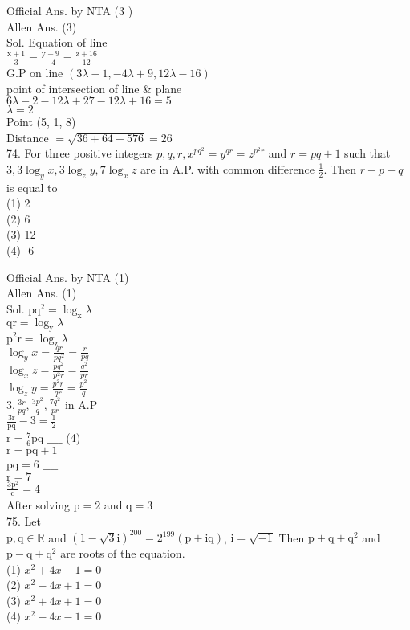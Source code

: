 \documentclass[10pt]{article}
\begin{document}
Official Ans. by NTA (3 )\\
Allen Ans. (3)\\
Sol. Equation of line\\
\(\frac{\mathrm{x}+1}{3}=\frac{\mathrm{y}-9}{-4}=\frac{\mathrm{z}+16}{12}\)\\
G.P on line \((3 \lambda-1,-4 \lambda+9,12 \lambda-16)\)\\
point of intersection of line \& plane\\
\(6 \lambda-2-12 \lambda+27-12 \lambda+16=5\)\\
\(\lambda=2\)\\
Point (5, 1, 8)\\
Distance \(=\sqrt{36+64+576}=26\)\\
74. For three positive integers \(p, q, r, x^{p q^{2}}=y^{q r}=z^{p^{2} r}\) and \(r=p q+1\) such that \(3,3 \log _{y} x, 3 \log _{z} y, 7 \log _{x} z\) are in A.P. with common difference \(\frac{1}{2}\). Then \(r-p-q\) is equal to\\
(1) 2\\
(2) 6\\
(3) 12\\
(4) -6

Official Ans. by NTA (1)\\
Allen Ans. (1)\\
Sol. \(\mathrm{pq}^{2}=\log _{\mathrm{x}} \lambda\)\\
\(\mathrm{qr}=\log _{\mathrm{y}} \lambda\)\\
\(\mathrm{p}^{2} \mathrm{r}=\log _{\mathrm{z}} \lambda\)\\
\(\log _{y} x=\frac{q r}{p q^{2}}=\frac{r}{p q}\)\\
\(\log _{x} z=\frac{p q^{2}}{p^{2} r}=\frac{q^{2}}{p r}\)\\
\(\log _{z} y=\frac{p^{2} r}{q r}=\frac{p^{2}}{q}\)\\
\(3, \frac{3 r}{p q}, \frac{3 p^{2}}{q}, \frac{7 q^{2}}{p r}\) in A.P\\
\(\frac{3 \mathrm{r}}{\mathrm{pq}}-3=\frac{1}{2}\)\\
\(\mathrm{r}=\frac{7}{6} \mathrm{pq}\) \(\_\_\_\_\) (4)\\
\(\mathrm{r}=\mathrm{pq}+1\)\\
\(\mathrm{pq}=6\) \(\_\_\_\_\)\\
\(\mathrm{r}=7\)\\
\(\frac{3 \mathrm{p}^{2}}{\mathrm{q}}=4\)\\
After solving \(\mathrm{p}=2\) and \(\mathrm{q}=3\)\\
75. Let\\
\(\mathrm{p}, \mathrm{q} \in \mathbb{R}\) and \((1-\sqrt{3} \mathrm{i})^{200}=2^{199}(\mathrm{p}+\mathrm{iq})\), \(\mathrm{i}=\sqrt{-1}\) Then \(\mathrm{p}+\mathrm{q}+\mathrm{q}^{2}\) and \(\mathrm{p}-\mathrm{q}+\mathrm{q}^{2}\) are roots of the equation.\\
(1) \(x^{2}+4 x-1=0\)\\
(2) \(x^{2}-4 x+1=0\)\\
(3) \(x^{2}+4 x+1=0\)\\
(4) \(x^{2}-4 x-1=0\)
\end{document}
